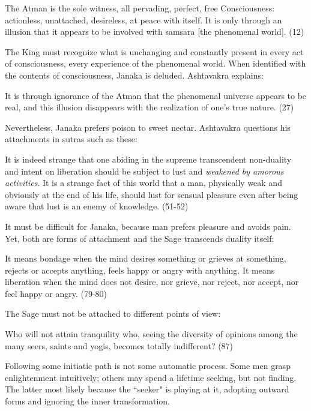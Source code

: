 \begin{quotex}
The Atman is the sole witness, all pervading, perfect, free Consciousness: actionless, unattached, desireless, at peace
with itself. It is only through an illusion that it appears to be involved with samsara [the phenomenal world]. (12) 

\end{quotex}
The King must recognize what is unchanging and constantly present in every act of consciousness, every experience of the
phenomenal world. When identified with the contents of consciousness, Janaka is deluded. Ashtavakra explains:

\begin{quotex}
It is through ignorance of the Atman that the phenomenal universe appears to be real, and this illusion disappears with
the realization of one's true nature. (27) 

\end{quotex}
Nevertheless, Janaka prefers poison to sweet nectar. Ashtavakra questions his attachments in sutras such as these:

\begin{quotex}
It is indeed strange that one abiding in the supreme transcendent non-duality and intent on liberation should be subject
to lust and \emph{weakened by amorous activities}. It is a strange fact of this world that a man, physically weak and
obviously at the end of his life, should lust for sensual pleasure even after being aware that lust is an enemy of
knowledge. (51-52) 

\end{quotex}
It must be difficult for Janaka, because man prefers pleasure and avoids pain. Yet, both are forms of attachment and the
Sage transcends duality itself:

\begin{quotex}
It means bondage when the mind desires something or grieves at something, rejects or accepts anything, feels happy or
angry with anything. It means liberation when the mind does not desire, nor grieve, nor reject, nor accept, nor feel
happy or angry. (79-80) 

\end{quotex}
The Sage must not be attached to different points of view:

\begin{quotex}
Who will not attain tranquility who, seeing the diversity of opinions among the many seers, saints and yogis, becomes
totally indifferent? (87) 

\end{quotex}
Following some initiatic path is not some automatic process. Some men grasp enlightenment intuitively; others may spend
a lifetime seeking, but not finding. The latter most likely because the ``seeker" is playing at it, adopting outward
forms and ignoring the inner transformation.

